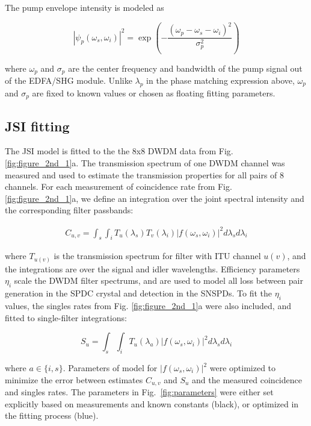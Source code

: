 \documentclass[11pt]{caltech_thesis} %
\begin{document}
The pump envelope intensity is modeled as

$$|\psi_p\left(\omega_s, \omega_i\right)|^2=\exp \left(-\frac{\left(\omega_p-\omega_s-\omega_i\right)^2}{\sigma_p^2}\right)$$

where $\omega_p$ and $\sigma_p$ are the center frequency and bandwidth of the pump signal out of the EDFA/SHG module. Unlike $\lambda_p$ in the phase matching expression above, $\omega_p$ and $\sigma_p$ are fixed to known values or chosen as floating fitting parameters.

\hypertarget{jsi-fitting}{%
\subsection{JSI fitting}\label{jsi-fitting}}

The JSI model is fitted to the the 8x8 DWDM data from Fig. \ref{fig:figure_2nd_1}a. The transmission spectrum of one DWDM channel was measured and used to estimate the transmission properties for all pairs of 8 channels. For each measurement of coincidence rate from Fig. \ref{fig:figure_2nd_1}a, we define an integration over the joint spectral intensity and the corresponding filter passbands:

\hypertarget{eq:c_uv}{}{
\begin{align}
    C_{u,v} = \int_{s}\int_{i}T_u(\lambda_s)T_v(\lambda_i)|f(\omega_s, \omega_i)|^2 d\lambda_s d\lambda_i \label{eq:c_uv}
\end{align}
}

where $T_{u(v)}$ is the transmission spectrum for filter with ITU channel $u (v)$, and the integrations are over the signal and idler wavelengths. Efficiency parameters $\eta_i$ scale the DWDM filter spectrums, and are used to model all loss between pair generation in the SPDC crystal and detection in the SNSPDs. To fit the $\eta_i$ values, the singles rates from Fig. \ref{fig:figure_2nd_1}a were also included, and fitted to single-filter integrations:

$$S_{u} = \int_{s}\int_{i}T_{u}(\lambda_a)|f(\omega_s, \omega_i)|^2 d\lambda_s d\lambda_i$$

where $a \in \{i, s\}$. Parameters of model for $|f(\omega_s, \omega_i)|^2$ were optimized to minimize the error between estimates $C_{u,v}$ and $S_u$ and the measured coincidence and singles rates. The parameters in Fig.~\ref{fig:parameters} were either set explicitly based on measurements and known constants (black), or optimized in the fitting process (blue).
\end{document}
